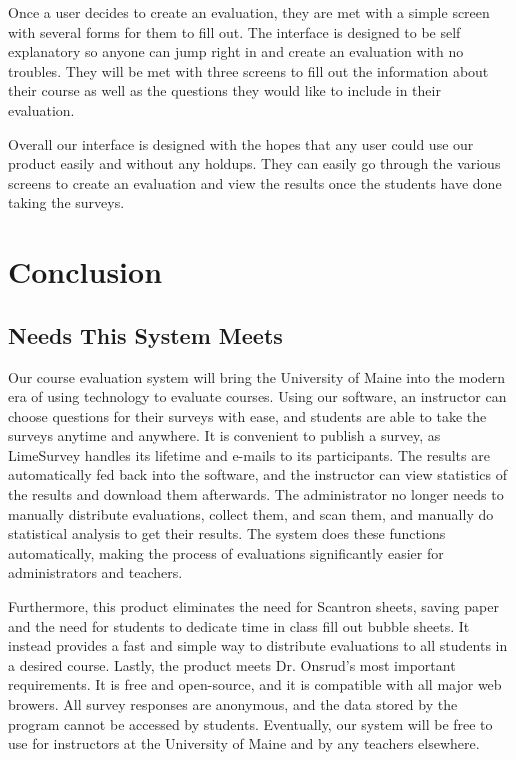 \documentclass{article}
\begin{document}
Once a user decides to create an evaluation, they are met with a simple screen with several forms for them to fill out. The interface is designed to be self explanatory so anyone can jump right in and create an evaluation with no troubles. They will be met with three screens to fill out the information about their course as well as the questions they would like to include in their evaluation. 

Overall our interface is designed with the hopes that any user could use our product easily and without any holdups. They can easily go through the various screens to create an evaluation and view the results once the students have done taking the surveys.

\newpage

\section{Conclusion}

\subsection{Needs This System Meets}

Our course evaluation system will bring the University of Maine into the modern era of using technology to evaluate courses. Using our software, an instructor can choose questions for their surveys with ease, and students are able to take the surveys anytime and anywhere. It is convenient to publish a survey, as LimeSurvey handles its lifetime and e-mails to its participants. The results are automatically fed back into the software, and the instructor can view statistics of the results and download them afterwards. The administrator no longer needs to manually distribute evaluations, collect them, and scan them, and manually do statistical analysis to get their results. The system does these functions automatically, making the process of evaluations significantly easier for administrators and teachers.

Furthermore, this product eliminates the need for Scantron sheets, saving paper and the need for students to dedicate time in class fill out bubble sheets. It instead provides a fast and simple way to distribute evaluations to all students in a desired course. Lastly, the product meets Dr. Onsrud's most important requirements. It is free and open-source, and it is compatible with all major web browers. All survey responses are anonymous, and the data stored by the program cannot be accessed by students. Eventually, our system will be free to use for instructors at the University of Maine and by any teachers elsewhere.
\end{document}
